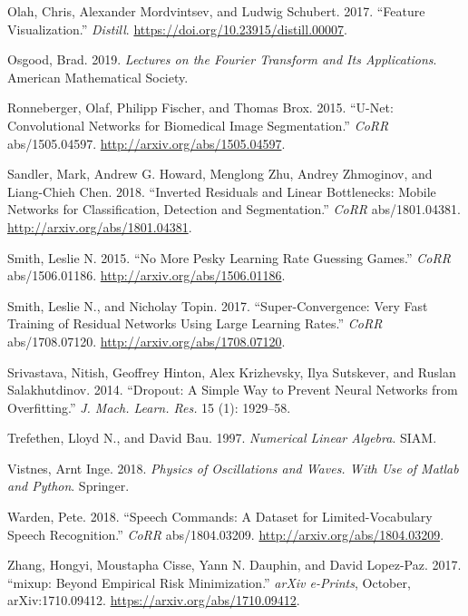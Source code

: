 \documentclass[
  letterpaper,
]{krantz}
\newlength{\cslhangindent}
\newlength{\cslentryspacingunit} %
\newenvironment{CSLReferences}[2] %
 {%
  \setlength{\parindent}{0pt}
  \ifodd #1
  \let\oldpar\par
  \def\par{\hangindent=\cslhangindent\oldpar}
  \fi
  \setlength{\parskip}{#2\cslentryspacingunit}
 }%
 {}
\begin{document}
\begin{CSLReferences}{1}{0}
\leavevmode{}%
Olah, Chris, Alexander Mordvintsev, and Ludwig Schubert. 2017.
{``Feature Visualization.''} \emph{Distill}.
\url{https://doi.org/10.23915/distill.00007}.

\leavevmode{}%
Osgood, Brad. 2019. \emph{Lectures on the Fourier Transform and Its
Applications}. American Mathematical Society.

\leavevmode{}%
Ronneberger, Olaf, Philipp Fischer, and Thomas Brox. 2015. {``U-Net:
Convolutional Networks for Biomedical Image Segmentation.''} \emph{CoRR}
abs/1505.04597. \url{http://arxiv.org/abs/1505.04597}.

\leavevmode{}%
Sandler, Mark, Andrew G. Howard, Menglong Zhu, Andrey Zhmoginov, and
Liang-Chieh Chen. 2018. {``Inverted Residuals and Linear Bottlenecks:
Mobile Networks for Classification, Detection and Segmentation.''}
\emph{CoRR} abs/1801.04381. \url{http://arxiv.org/abs/1801.04381}.

\leavevmode{}%
Smith, Leslie N. 2015. {``No More Pesky Learning Rate Guessing Games.''}
\emph{CoRR} abs/1506.01186. \url{http://arxiv.org/abs/1506.01186}.

\leavevmode{}%
Smith, Leslie N., and Nicholay Topin. 2017. {``Super-Convergence: Very
Fast Training of Residual Networks Using Large Learning Rates.''}
\emph{CoRR} abs/1708.07120. \url{http://arxiv.org/abs/1708.07120}.

\leavevmode{}%
Srivastava, Nitish, Geoffrey Hinton, Alex Krizhevsky, Ilya Sutskever,
and Ruslan Salakhutdinov. 2014. {``Dropout: A Simple Way to Prevent
Neural Networks from Overfitting.''} \emph{J. Mach. Learn. Res.} 15 (1):
1929--58.

\leavevmode{}%
Trefethen, Lloyd N., and David Bau. 1997. \emph{Numerical Linear
Algebra}. SIAM.

\leavevmode{}%
Vistnes, Arnt Inge. 2018. \emph{Physics of Oscillations and Waves. With
Use of Matlab and Python}. Springer.

\leavevmode{}%
Warden, Pete. 2018. {``Speech Commands: {A} Dataset for
Limited-Vocabulary Speech Recognition.''} \emph{CoRR} abs/1804.03209.
\url{http://arxiv.org/abs/1804.03209}.

\leavevmode{}%
Zhang, Hongyi, Moustapha Cisse, Yann N. Dauphin, and David Lopez-Paz.
2017. {``{mixup: Beyond Empirical Risk Minimization}.''} \emph{arXiv
e-Prints}, October, arXiv:1710.09412.
\url{https://arxiv.org/abs/1710.09412}.

\end{CSLReferences}



\printindex
\end{document}
